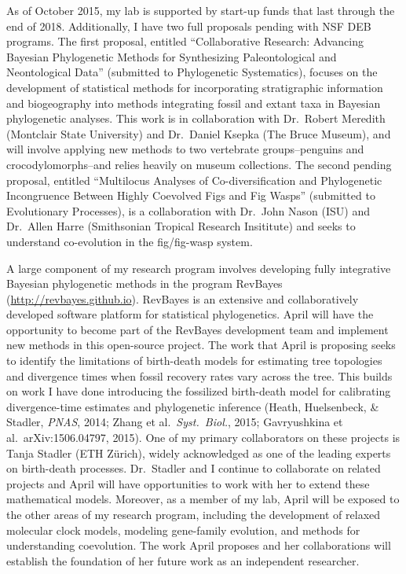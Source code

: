 \documentclass[11pt]{article}
\begin{document}
As of October 2015, my lab is supported by start-up funds that last through the end of 2018. 
Additionally, I have two full proposals pending with NSF DEB programs. 
The first proposal, entitled ``Collaborative Research: Advancing Bayesian Phylogenetic Methods for Synthesizing Paleontological and Neontological Data'' (submitted to Phylogenetic Systematics), focuses on the development of statistical methods for incorporating stratigraphic information and biogeography into methods integrating fossil and extant taxa in Bayesian phylogenetic analyses. 
This work is in collaboration with Dr.~Robert Meredith (Montclair State University) and Dr.~Daniel Ksepka (The Bruce Museum), and will involve applying new methods to two vertebrate groups--penguins and crocodylomorphs--and relies heavily on museum collections. 
The second pending proposal, entitled ``Multilocus Analyses of Co-diversification and Phylogenetic Incongruence Between Highly Coevolved Figs and Fig Wasps'' (submitted to Evolutionary Processes), is a collaboration with Dr.\ John Nason (ISU) and Dr.\ Allen Harre (Smithsonian Tropical Research Insititute) and seeks to understand co-evolution in the fig/fig-wasp system.

A large component of my research program involves developing fully integrative Bayesian phylogenetic methods in the program RevBayes (\href{http://revbayes.github.io/about.html}{http://revbayes.github.io}). 
RevBayes is an extensive and collaboratively developed software platform for statistical phylogenetics.
April will have the opportunity to become part of the RevBayes development team and implement new methods in this open-source project. 
The work that April is proposing seeks to identify the limitations of birth-death models for estimating tree topologies and divergence times when fossil recovery rates vary across the tree. 
This builds on work I have done introducing the fossilized birth-death model for calibrating divergence-time estimates and phylogenetic inference (Heath, Huelsenbeck, \& Stadler, \textit{PNAS}, 2014; Zhang et al.\ \textit{Syst.\ Biol.}, 2015; Gavryushkina et al.\ arXiv:1506.04797, 2015). 
One of my primary collaborators on these projects is Tanja Stadler (ETH Z\"{u}rich), widely acknowledged as one of the leading experts on birth-death processes. 
Dr.~Stadler and I continue to collaborate on related projects and April will have opportunities to work with her to extend these mathematical models. 
Moreover, as a member of my lab, April will be exposed to the other areas of my research program, including the development of relaxed molecular clock models, modeling gene-family evolution, and methods for understanding coevolution.
The work April proposes and her collaborations will establish the foundation of her future work as an independent researcher.
\end{document}
